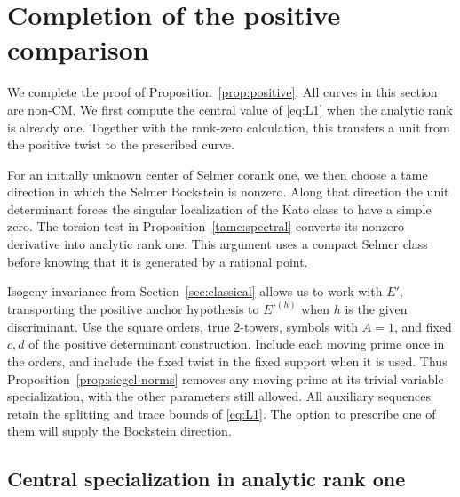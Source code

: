 \section{Completion of the positive comparison}\label{sec:positive-completion}

We complete the proof of Proposition~\ref{prop:positive}. All curves in
this section are non-CM. We first compute the central value of
\eqref{eq:L1} when the analytic rank is already one. Together with the
rank-zero calculation, this transfers a unit from the positive twist to
the prescribed curve.

For an initially unknown center of Selmer corank one, we then choose a
tame direction in which the Selmer Bockstein is nonzero. Along that
direction the unit determinant forces the singular localization of the
Kato class to have a simple zero. The torsion test in
Proposition~\ref{tame:spectral} converts its nonzero derivative into
analytic rank one. This argument uses a compact Selmer class before
knowing that it is generated by a rational point.

Isogeny invariance from Section~\ref{sec:classical} allows us to work
with \(E'\), transporting the positive anchor hypothesis to
\(E'^{(h)}\) when \(h\) is the given discriminant. Use the square orders,
true \(2\)-towers, symbols with \(A=1\), and fixed \(c,d\) of the
positive determinant construction. Include each moving prime once in
the orders, and include the fixed twist in the fixed support when it
is used. Thus Proposition~\ref{prop:siegel-norms} removes any moving
prime at its trivial-variable specialization, with the other
parameters still allowed. All auxiliary sequences retain the splitting
and trace bounds of \eqref{eq:L1}. The option to prescribe one of them
will supply the Bockstein direction.

\subsection{Central specialization in analytic rank one}

